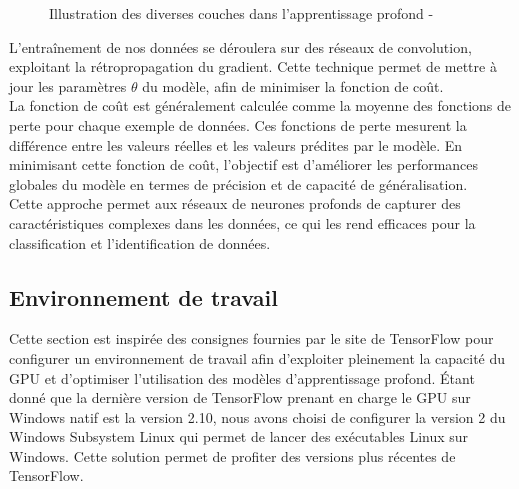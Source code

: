 \begin{figure}[H]
            \centering
            \caption{Illustration des diverses couches dans l'apprentissage profond -  \cite{hiddenlayer}} 
        \end{figure}


\noindent L'entraînement de nos données se déroulera sur des réseaux de convolution, exploitant la rétropropagation du gradient. Cette technique permet de mettre à jour les paramètres $\theta$ du modèle, afin de minimiser la fonction de coût.\\


\noindent La fonction de coût est généralement calculée comme la moyenne des fonctions de perte pour chaque exemple de données. Ces fonctions de perte mesurent la différence entre les valeurs réelles et les valeurs prédites par le modèle. En minimisant cette fonction de coût, l'objectif est d'améliorer les performances globales du modèle en termes de précision et de capacité de généralisation.\\

\noindent Cette approche permet aux réseaux de neurones profonds de capturer des caractéristiques complexes dans les données, ce qui les rend efficaces pour la classification et l'identification de données.



\subsection{Environnement de travail}

Cette section est inspirée des consignes fournies par le site de TensorFlow \cite{TensorFlow} pour configurer un environnement de travail afin d'exploiter pleinement la capacité du GPU et d'optimiser l'utilisation des modèles d'apprentissage profond. Étant donné que la dernière version de TensorFlow prenant en charge le GPU sur Windows natif est la version 2.10, nous avons choisi de configurer la version 2 du Windows Subsystem Linux qui permet de lancer des exécutables Linux sur Windows. Cette solution permet de profiter des versions plus récentes de TensorFlow. \\

